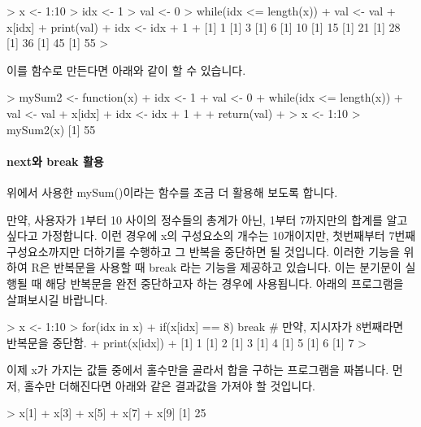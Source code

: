 \documentclass{book}
\begin{document}
\begin{Schunk}
\begin{Soutput}
> x <- 1:10
> idx <- 1
> val <- 0
> while(idx <= length(x)){
+ val <- val + x[idx]
+ print(val)
+ idx <- idx + 1
+ }
[1] 1
[1] 3
[1] 6
[1] 10
[1] 15
[1] 21
[1] 28
[1] 36
[1] 45
[1] 55
> 
\end{Soutput}
\end{Schunk}

이를 함수로 만든다면 아래와 같이 할 수 있습니다. 

\begin{Schunk}
\begin{Soutput}
> mySum2 <- function(x){
+ idx <- 1
+ val <- 0
+ while(idx <= length(x)){
+ val <- val + x[idx]
+ idx <- idx + 1
+ }
+ return(val)
+ }
> x <- 1:10
> mySum2(x)
[1] 55
\end{Soutput}
\end{Schunk}

\paragraph{next와 break 활용}

위에서 사용한 mySum()이라는 함수를 조금 더 활용해 보도록 합니다.

만약, 사용자가 1부터 10 사이의 정수들의 총계가 아닌, 1부터 7까지만의 합계를 알고 싶다고 가정합니다. 
이런 경우에 x의 구성요소의 개수는 10개이지만, 첫번째부터 7번째 구성요소까지만 더하기를 수행하고 그 반복을 중단하면 될 것입니다.
이러한 기능을 위하여 R은 반복문을 사용할 때 break 라는 기능을 제공하고 있습니다.
이는 분기문이 실행될 때 해당 반복문을 완전 중단하고자 하는 경우에 사용됩니다. 
아래의 프로그램을 살펴보시길 바랍니다. 

\begin{Schunk}
\begin{Soutput}
> x <- 1:10
> for(idx in x){
+ if(x[idx] == 8) break  # 만약, 지시자가 8번째라면 반복문을 중단함. 
+ print(x[idx])
+ }
[1] 1
[1] 2
[1] 3
[1] 4
[1] 5
[1] 6
[1] 7
> 
\end{Soutput}
\end{Schunk}

이제 x가 가지는 값들 중에서 홀수만을 골라서 합을 구하는 프로그램을 짜봅니다. 
먼저, 홀수만 더해진다면 아래와 같은 결과값을 가져야 할 것입니다. 

\begin{Schunk}
\begin{Soutput}
> x[1] + x[3] + x[5] + x[7] + x[9]
[1] 25
\end{Soutput}
\end{Schunk}
\end{document}
